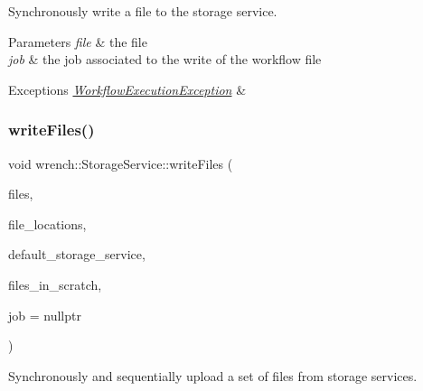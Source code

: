 Synchronously write a file to the storage service. 


\begin{DoxyParams}{Parameters}
{\em file} & the file \\
\hline
{\em job} & the job associated to the write of the workflow file\\
\hline
\end{DoxyParams}

\begin{DoxyExceptions}{Exceptions}
{\em \hyperlink{classwrench_1_1_workflow_execution_exception}{Workflow\+Execution\+Exception}} & \\
\hline
\end{DoxyExceptions}
\mbox{\label{classwrench_1_1_storage_service_a01359f369729358f030775ae0542bd5a}} 
\subsubsection{\texorpdfstring{write\+Files()}{writeFiles()}}
{\footnotesize\ttfamily void wrench\+::\+Storage\+Service\+::write\+Files (\begin{DoxyParamCaption}\item[{std\+::set$<$ \hyperlink{classwrench_1_1_workflow_file}{Workflow\+File} $\ast$$>$}]{files,  }\item[{std\+::map$<$ \hyperlink{classwrench_1_1_workflow_file}{Workflow\+File} $\ast$, \hyperlink{classwrench_1_1_storage_service}{Storage\+Service} $\ast$$>$}]{file\+\_\+locations,  }\item[{\hyperlink{classwrench_1_1_storage_service}{Storage\+Service} $\ast$}]{default\+\_\+storage\+\_\+service,  }\item[{std\+::set$<$ \hyperlink{classwrench_1_1_workflow_file}{Workflow\+File} $\ast$$>$ \&}]{files\+\_\+in\+\_\+scratch,  }\item[{\hyperlink{classwrench_1_1_workflow_job}{Workflow\+Job} $\ast$}]{job = {\ttfamily nullptr} }\end{DoxyParamCaption})\hspace{0.3cm}{\ttfamily [static]}}



Synchronously and sequentially upload a set of files from storage services. 


